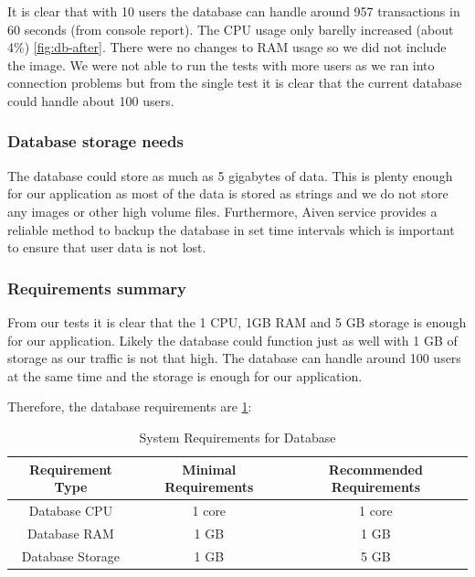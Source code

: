 \documentclass[]{VUMIFTemplateClass}
\begin{document}
It is clear that with 10 users the database can handle around 957 transactions in 60 seconds (from console report). The CPU usage only barelly increased (about 4\%) \ref{fig:db-after}. There were no changes to RAM usage so we did not include the image.
We were not able to run the tests with more users as we ran into connection problems but from the single test it is clear that the current database could handle about 100 users.

\subsubsection{Database storage needs}

The database could store as much as 5 gigabytes of data. This is plenty enough for our application as most
of the data is stored as strings and we do not store any images or other high volume files. Furthermore, Aiven service provides
a reliable method to backup the database in set time intervals which is important to ensure that user data is not lost.\\

\subsubsection{Requirements summary}
From our tests it is clear that the 1 CPU, 1GB RAM and 5 GB storage is enough for our application. Likely the database could function just as well with 1 GB of storage as our traffic is not that high. 
The database can handle around 100 users at the same time and the storage is enough for our application.

Therefore, the database requirements are \ref{tab:system-requirements}:
\begin{table}[H]
    \centering
    \begin{tabular}{|c|c|c|}
        \hline
        \textbf{Requirement Type} & \textbf{Minimal Requirements} & \textbf{Recommended Requirements} \\ 
        \hline
        Database CPU & 1 core & 1 core \\ 
        \hline
        Database RAM & 1 GB & 1 GB \\ 
        \hline
        Database Storage & 1 GB & 5 GB \\ 
        \hline
    \end{tabular}
    \caption{System Requirements for Database}
    \label{tab:system-requirements}
\end{table}
\end{document}
